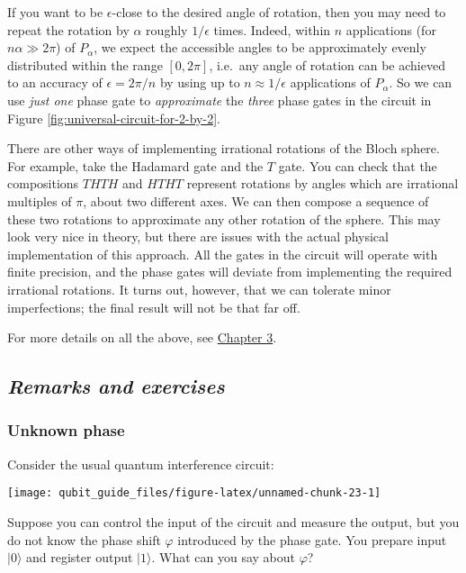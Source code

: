 \documentclass[fleqn]{article}
\begin{document}
If you want to be \(\epsilon\)-close to the desired angle of rotation, then you may need to repeat the rotation by \(\alpha\) roughly \(1/\epsilon\) times.
Indeed, within \(n\) applications (for \(n\alpha\gg 2\pi\)) of \(P_\alpha\), we expect the accessible angles to be approximately evenly distributed within the range \([0,2\pi]\), i.e.~any angle of rotation can be achieved to an accuracy of \(\epsilon=2\pi/n\) by using up to \(n\approx 1/\epsilon\) applications of \(P_\alpha\).
So we can use \emph{just one} phase gate to \emph{approximate} the \emph{three} phase gates in the circuit in Figure \ref{fig:universal-circuit-for-2-by-2}.

There are other ways of implementing irrational rotations of the Bloch sphere.
For example, take the Hadamard gate and the \(T\) gate.
You can check that the compositions \(THTH\) and \(HTHT\) represent rotations by angles which are irrational multiples of \(\pi\), about two different axes.
We can then compose a sequence of these two rotations to approximate any other rotation of the sphere.
This may look very nice in theory, but there are issues with the actual physical implementation of this approach.
All the gates in the circuit will operate with finite precision, and the phase gates will deviate from implementing the required irrational rotations.
It turns out, however, that we can tolerate minor imperfections; the final result will not be that far off.

For more details on all the above, see \protect\hyperlink{quantum-gates}{Chapter 3}.

\hypertarget{remarks-and-exercises-2}{%
\subsection{\texorpdfstring{\emph{Remarks and exercises}}{Remarks and exercises}}\label{remarks-and-exercises-2}}

\hypertarget{unknown-phase}{%
\subsubsection{Unknown phase}\label{unknown-phase}}

Consider the usual quantum interference circuit:

\begin{center}\texttt{[image: qubit\_guide\_files/figure-latex/unnamed-chunk-23-1]} \end{center}

Suppose you can control the input of the circuit and measure the output, but you do not know the phase shift \(\varphi\) introduced by the phase gate.
You prepare input \(|0\rangle\) and register output \(|1\rangle\).
What can you say about \(\varphi\)?
\end{document}
